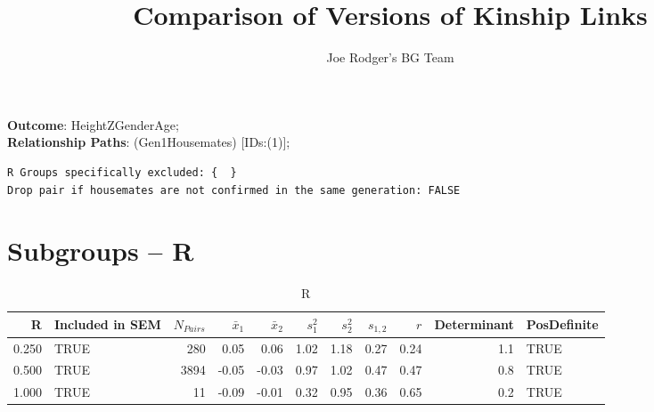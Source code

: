\documentclass{article}\usepackage[]{graphicx}\usepackage[]{color}
\title{Comparison of Versions of Kinship Links}
\author{Joe Rodger's BG Team}
\makeatletter
\newenvironment{kframe}{%
 \def\at@end@of@kframe{}%
 \ifinner\ifhmode%
  \def\at@end@of@kframe{\end{minipage}}%
  \begin{minipage}{\columnwidth}%
 \fi\fi%
 \def\FrameCommand##1{\hskip\@totalleftmargin \hskip-\fboxsep
 \colorbox{shadecolor}{##1}\hskip-\fboxsep
     \hskip-\linewidth \hskip-\@totalleftmargin \hskip\columnwidth}%
 \MakeFramed {\advance\hsize-\width
   \@totalleftmargin\z@ \linewidth\hsize
   \@setminipage}}%
 {\par\unskip\endMakeFramed%
 \at@end@of@kframe}
\newenvironment{knitrout}{}{} %
\makeatother
\begin{document}
\maketitle
\setcounter{totalnumber}{8} %

\setlength{\parindent}{0pt}%














\textbf{Outcome}: HeightZGenderAge;\\
\textbf{Relationship Paths}: (Gen1Housemates) [IDs:(1)];\\

\begin{knitrout}
\color{fgcolor}\begin{kframe}
\begin{verbatim}
R Groups specifically excluded: {  }
Drop pair if housemates are not confirmed in the same generation: FALSE
\end{verbatim}
\end{kframe}
\end{knitrout}

\section{Subgroups --  R }%
\begin{table}[ht]
\centering
\begin{tabular}{rlrrrrrrrrl}
  \hline
R & Included in SEM & $N_{Pairs}$ & $\bar{x}_1$ & $\bar{x}_2$ & $s_1^2$ & $s_2^2$ & $s_{1,2}$ & $r$ & Determinant & PosDefinite \\ 
  \hline
0.250 & TRUE & 280 & 0.05 & 0.06 & 1.02 & 1.18 & 0.27 & 0.24 & 1.1 & TRUE \\ 
  0.500 & TRUE & 3894 & -0.05 & -0.03 & 0.97 & 1.02 & 0.47 & 0.47 & 0.8 & TRUE \\ 
  1.000 & TRUE & 11 & -0.09 & -0.01 & 0.32 & 0.95 & 0.36 & 0.65 & 0.2 & TRUE \\ 
   \hline
\end{tabular}
\caption{R} 
\end{table}
\end{document}
